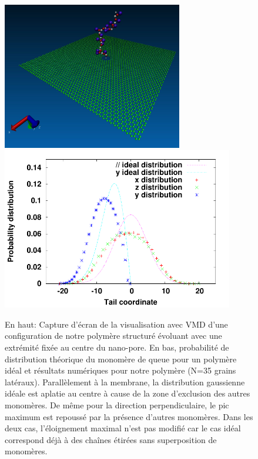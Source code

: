 \begin{figure}[H]
\begin{center}


\includegraphics[width=0.7\textwidth]{confinit.jpg}
\includegraphics[width=0.9\textwidth]{probdistribution.pdf}


\caption[Polymère greffé sur une membrane]{En haut: Capture d'écran de la visualisation avec VMD \cite{HUMP96,STON2001} d'une configuration de notre polymère structuré évoluant avec une extrémité fixée au centre du nano-pore. En bas, probabilité de distribution théorique du monomère de queue pour un polymère idéal et résultats numériques pour notre polymère (N=35 grains latéraux). Parallèlement à la membrane, la distribution gaussienne idéale est aplatie au centre à cause de la zone d'exclusion des autres monomères. De même pour la direction perpendiculaire, le pic maximum est repoussé par la présence d'autres monomères. Dans les deux cas, l'éloignement maximal n'est pas modifié car le cas idéal correspond déjà à des chaînes étirées sans superposition de monomères. }
\label{polagainstwall}
\end{center}
\end{figure}

